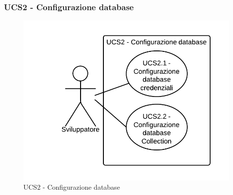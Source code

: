 \subsubsection{UCS2 - Configurazione database} 
    \begin{figure}[H]
      \begin{center}
      \includegraphics[scale=0.16]{UML/UCS2 - Configurazione database.png}
      \caption{UCS2 - Configurazione database}
      \end{center} 
    \end{figure}  
    
